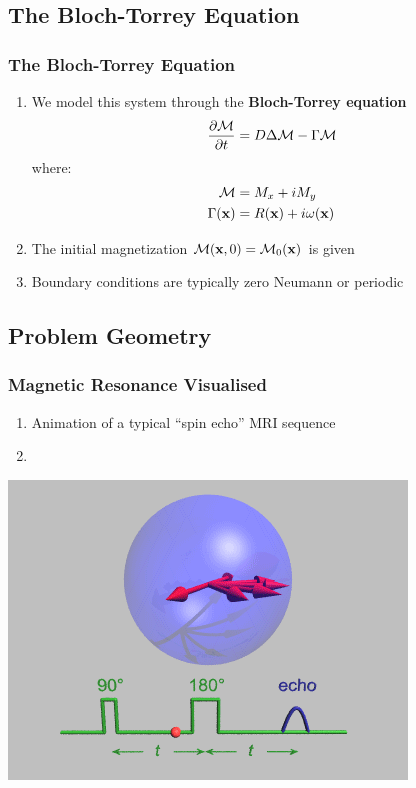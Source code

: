 \subsection{The Bloch-Torrey Equation}

\begin{frame}
\frametitle{The Bloch-Torrey Equation}
\begin{enumerate}
    \item We model this system through the \textbf{Bloch-Torrey equation}
    $$ \frac{\partial \mathcal{M}}{\partial t} = D \mbox{$\Delta$}{\mathcal{M}} - \Gamma \mathcal{M} $$
    where:
    \begin{align*}
        \mathcal{M} &= M_x + i M_y \\
        \Gamma(\mathbf{x}) &= R(\mathbf{x}) + i\omega(\mathbf{x})
    \end{align*}
    \item The initial magnetization $\mathcal{M}(\mathbf{x},0) = \mathcal{M}_0(\mathbf{x})$ is given
    \item Boundary conditions are typically zero Neumann or periodic
\end{enumerate}
\end{frame}

\subsection{Problem Geometry}

\begin{frame}
\frametitle{Magnetic Resonance Visualised}
\begin{enumerate}
    \item Animation of a typical ``spin echo'' MRI sequence
    \item {} %
\end{enumerate}
\centering
\includegraphics[width=0.7\linewidth]{gifs/HahnEcho_GWM-100}
\end{frame}


